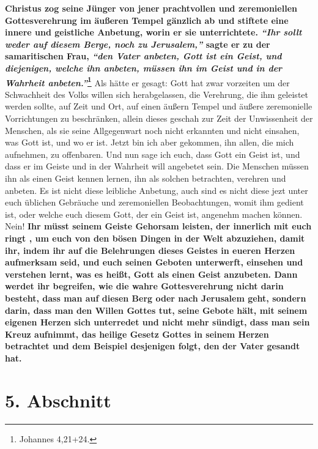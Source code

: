   
\textbf{Christus zog seine Jünger von jener prachtvollen und zeremoniellen
Gottesverehrung im äußeren Tempel gänzlich ab und stiftete eine innere und
geistliche Anbetung, worin er sie unterrichtete.
\textit{"`Ihr sollt weder auf diesem Berge, noch zu Jerusalem,"'}
sagte er zu der samaritischen Frau,
\textit{"`den Vater anbeten, Gott ist ein Geist, und diejenigen, welche ihn
anbeten, müssen ihn im Geist und in der Wahrheit anbeten."'}\footnote{Johannes
4,21+24.}
}
Als hätte er
gesagt: Gott hat zwar vorzeiten um der Schwachheit des Volks willen sich
herabgelassen, die Verehrung, die ihm geleistet werden sollte, auf Zeit und Ort,
auf einen äußern Tempel und äußere zeremonielle Vorrichtungen zu beschränken,
allein dieses geschah zur Zeit der Unwissenheit der Menschen, als sie seine
Allgegenwart noch nicht erkannten und nicht einsahen, was Gott ist, und wo er
ist. Jetzt bin ich aber gekommen, ihn allen, die mich aufnehmen, zu offenbaren.
Und nun sage ich euch, dass Gott ein Geist ist, und dass er im Geiste und in der
Wahrheit will angebetet sein. Die Menschen müssen ihn als einen Geist kennen
lernen, ihn als solchen betrachten, verehren und anbeten. Es ist nicht diese
leibliche Anbetung, auch sind es nicht diese
jezt unter euch üblichen Gebräuche
und zeremoniellen Beobachtungen, womit ihm gedient ist, oder welche euch diesem
Gott, der ein Geist ist, angenehm machen können. Nein!
\label{ref:05_04_wahre_anbetung}
\textbf{Ihr müsst seinem Geiste
Gehorsam leisten, der innerlich mit euch ringt , um
euch von den bösen Dingen in
der Welt abzuziehen, damit ihr, indem ihr auf die Belehrungen dieses Geistes in
eueren Herzen aufmerksam seid, und euch seinen Geboten unterwerft, einsehen und
verstehen lernt, was es heißt, Gott als einen Geist anzubeten. Dann werdet ihr
begreifen, wie die wahre Gottesverehrung nicht darin besteht, dass man auf
diesen Berg oder nach Jerusalem geht, sondern darin, dass man den Willen Gottes
tut, seine Gebote hält, mit seinem eigenen Herzen sich unterredet und nicht
mehr sündigt, dass man sein Kreuz aufnimmt, das heilige Gesetz Gottes in seinem
Herzen betrachtet und dem Beispiel desjenigen folgt, den der Vater gesandt
hat.}

\section{5. Abschnitt} \label{kap5_ab5}

